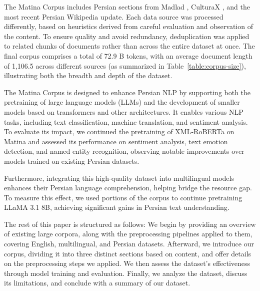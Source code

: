 The Matina Corpus includes Persian sections from Madlad \citep{kudugunta2024madlad}, CulturaX \citep{nguyen2023culturax}, and the most recent Persian Wikipedia update.  Each data source was processed differently, based on heuristics derived from careful evaluation and observation of the content. To ensure quality and avoid redundancy, deduplication was applied to related chunks of documents rather than across the entire dataset at once. The final corpus comprises a total of 72.9 B tokens, with an average document length of 1,106.5 across different sources (as summarized in Table~\ref{table:corpus-size}), illustrating both the breadth and depth of the dataset.


The Matina Corpus is designed to enhance Persian NLP by supporting both the pretraining of large language models (LLMs) and the development of smaller models based on transformers and other architectures. It enables various NLP tasks, including text classification, machine translation, and sentiment analysis. To evaluate its impact, we continued the pretraining of XML-RoBERTa \citep{conneau2019unsupervised} on Matina and assessed its performance on sentiment analysis, text emotion detection, and named entity recognition, observing notable improvements over models trained on existing Persian datasets.

Furthermore, integrating this high-quality dataset into multilingual models enhances their Persian language comprehension, helping bridge the resource gap. To measure this effect, we used portions of the corpus to continue pretraining LLaMA 3.1 8B, achieving significant gains in Persian text understanding.

The rest of this paper is structured as follows: We begin by providing an overview of existing large corpora, along with the preprocessing pipelines applied to them, covering English, multilingual, and Persian datasets. Afterward, we introduce our corpus, dividing it into three distinct sections based on content, and offer details on the preprocessing steps we applied. We then assess the dataset’s effectiveness through model training and evaluation. Finally, we analyze the dataset, discuss its limitations, and conclude with a summary of our dataset.
